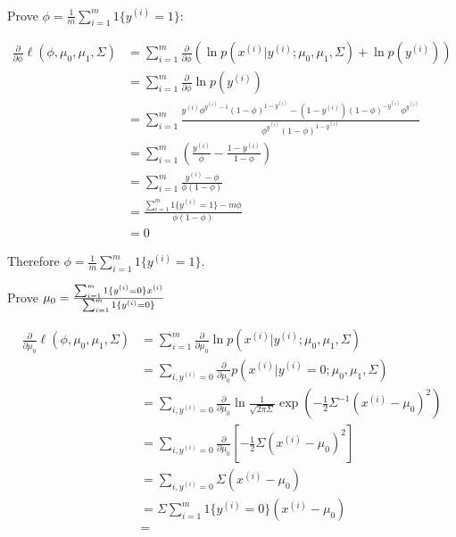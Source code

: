 \begin{answer}
	\\
	Prove $\phi = \frac{1}{m} \sum_{i=1}^m 1\{y^{(i)} = 1\}$:
	
	\begin{align*}
		\frac{\partial}{\partial \phi} \ell(\phi, \mu_0, \mu_1, \Sigma) & = \sum_{i = 1}^m \frac{\partial}{\partial \phi} (\ln p(x^{(i)} | y^{(i)}; \mu_{0}, \mu_1, \Sigma) + \ln p(y^{(i)}))\\
		& = \sum_{i = 1}^m \frac{\partial}{\partial \phi} \ln p(y^{(i)})\\
		& = \sum_{i = 1}^m \frac{y^{(i)} \phi^{y^{(i)} - 1} (1 - \phi)^{1 - y^{(i)}} - (1 - y^{(i)}) (1 - \phi)^{-y^{(i)}} \phi^{y^{(i)}}}{\phi^{y^{(i)}} (1 - \phi)^{1 - y^{(i)}}}\\
		& = \sum_{i = 1}^m \left(\frac{y^{(i)}}{\phi} - \frac{1 - y^{(i)}}{1 - \phi}\right)\\
		& = \sum_{i = 1}^m \frac{y^{(i)} - \phi}{\phi (1 - \phi)}\\
		& = \frac{\sum_{i = 1}^m 1\{y^{(i)} = 1\} - m\phi}{\phi (1 - \phi)}\\
		& = 0
	\end{align*}
	
	Therefore $\phi = \frac{1}{m} \sum_{i = 1}^{m} 1\{y^{(i)} = 1\}$.
	
	Prove $\mu_{0} = \frac{\sum_{i=1}^m 1\{y^{(i)} = {0}\} x^{(i)}}{\sum_{i=1}^m 1\{y^{(i)} = {0}\}} \\$
	
	\begin{align*}
		\frac{\partial}{\partial \mu_0} \ell(\phi, \mu_0, \mu_1, \Sigma) & = \sum_{i = 1}^m \frac{\partial}{\partial \mu_0} \ln p(x^{(i)} | y^{(i)}; \mu_{0}, \mu_1, \Sigma)\\
		& = \sum_{i,y^{(i)} = 0} \frac{\partial}{\partial \mu_0} p(x^{(i)} | y^{(i)} = 0; \mu_{0}, \mu_1, \Sigma)\\
		& = \sum_{i,y^{(i)} = 0} \frac{\partial}{\partial \mu_0} \ln \frac{1}{\sqrt{2\pi\Sigma}} \exp\left(-\frac{1}{2} \Sigma^{-1} (x^{(i)} - \mu_0)^2\right)\\
		& = \sum_{i,y^{(i)} = 0} \frac{\partial}{\partial \mu_0} [-\frac{1}{2}\Sigma (x^{(i)} - \mu_0)^2 ] \\
		& = \sum_{i,y^{(i)} = 0} \Sigma (x^{(i)} - \mu_0)\\
		& = \Sigma \sum_{i = 1}^m 1\{y^{(i)} = 0\}(x^{(i)} - \mu_0)\\
		& = 
	\end{align*}
	

\end{answer}
